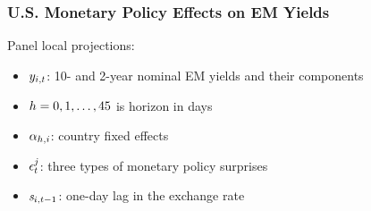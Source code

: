 \documentclass[12pt, aspectratio=169, xcolor=dvipsnames]{beamer}
\begin{document}
\begin{frame}
\frametitle{U.S. Monetary Policy Effects on EM Yields}
Panel local projections:
\begin{itemize}
\item \(y_{i,t}\): 10- and 2-year nominal EM yields and their components
\item \(h = 0, 1, \ldots, 45\) is horizon in days
\item \(\alpha_{h,i}\): country fixed effects
\item \(\epsilon^{j}_{t}\): three types of \alert{monetary policy surprises}
\item \(\mathit{s}_{i,{t-1}}\): one-day lag in the exchange rate
\end{itemize}
\end{frame}
\end{document}
